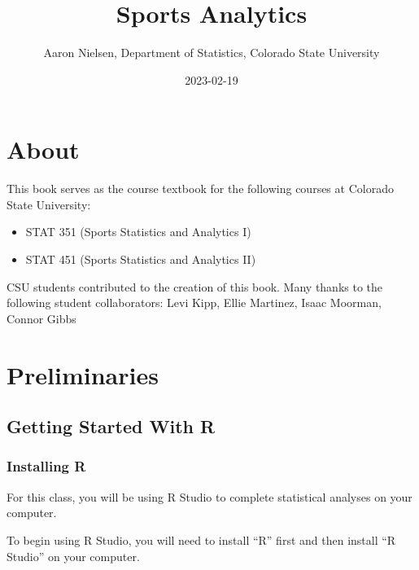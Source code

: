 \documentclass[
  11pt,
]{book}
\title{Sports Analytics}
\author{Aaron Nielsen, Department of Statistics, Colorado State University}
\date{2023-02-19}
\theoremstyle{definition}
\theoremstyle{definition}
\theoremstyle{definition}
\theoremstyle{definition}
\theoremstyle{remark}
\begin{document}
\maketitle

{
\setcounter{tocdepth}{1}
\tableofcontents
}
\hypertarget{about}{%
\chapter*{About}\label{about}}

This book serves as the course textbook for the following courses at Colorado State University:

\begin{itemize}
\item
  STAT 351 (Sports Statistics and Analytics I)
\item
  STAT 451 (Sports Statistics and Analytics II)
\end{itemize}

\hfill\break

CSU students contributed to the creation of this book. Many thanks to the following student collaborators: Levi Kipp, Ellie Martinez, Isaac Moorman, Connor Gibbs

\hypertarget{preliminaries}{%
\chapter*{Preliminaries}\label{preliminaries}}

\hypertarget{getting-started-with-r}{%
\section*{Getting Started With R}\label{getting-started-with-r}}

\hypertarget{installing-r}{%
\subsection*{Installing R}\label{installing-r}}

For this class, you will be using R Studio to complete statistical analyses on your computer.

To begin using R Studio, you will need to install ``R'' first and then install ``R Studio'' on your computer.
\end{document}
